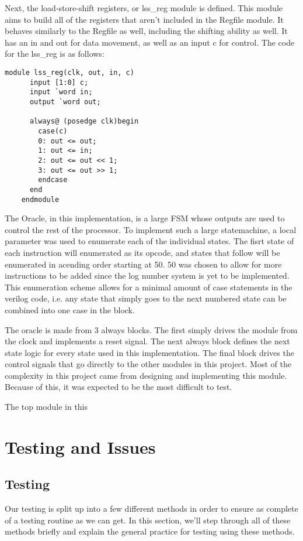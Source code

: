 \documentclass[journal]{IEEEtran}
\begin{document}
	Next, the load\--store\--shift registers, or lss\_reg module is defined. This module aims to build all of the registers that aren't included in the Regfile module. It behaves similarly to the Regfile as well, including the shifting ability as well. It has an in and out for data movement, as well as an input c for control. The code for the lss\_reg is as follows:
	
	\begin{Verbatim}[fontsize=\small]
	module lss_reg(clk, out, in, c)
	  input [1:0] c;
	  input `word in;
	  output `word out;
	
	  always@ (posedge clk)begin
	    case(c)
		0: out <= out;
		1: out <= in;
		2: out <= out << 1;
		3: out <= out >> 1;
		endcase
	  end
	endmodule
	\end{Verbatim}
	
	The Oracle, in this implementation, is a large FSM whose outputs are used to control the rest of the processor. To implement such a large statemachine, a local parameter was used to enumerate each of the individual states. The fisrt state of each instruction will enumerated as its opcode, and states that follow will be enumerated in acending order starting at 50. 50 was chosen to allow for more instructions to be added since the log number system is yet to be implemented. This enumeration scheme allows for a minimal amount of case statements in the verilog code, i.e. any state that simply goes to the next numbered state can be combined into one case in the block. 
	
	The oracle is made from 3 always blocks. The first simply drives the module from the clock and implements a reset signal. The next always block defines the next state logic for every state used in this implementation. The final block drives the control signals that go directly to the other modules in this project. Most of the complexity in this project came from designing and implementing this module. Because of this, it was expected to be the most difficult to test.
	
	The top module in this
	
\section{Testing and Issues}
\subsection{Testing}
	Our testing is split up into a few different methods in order to ensure as complete of a testing routine as we can get. In this section, we'll step through all of these methods briefly and explain the general practice for testing using these methods. 
	
\end{document}
